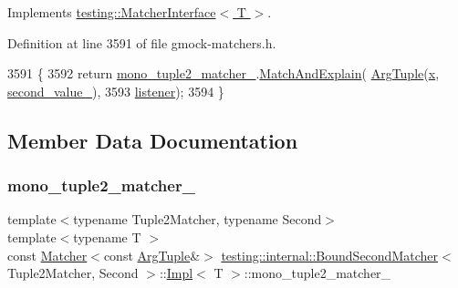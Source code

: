 Implements \hyperlink{classtesting_1_1MatcherInterface_a296b43607cd99d60365f0e6a762777cf}{testing\+::\+Matcher\+Interface$<$ T $>$}.



Definition at line 3591 of file gmock-\/matchers.\+h.


\begin{DoxyCode}
3591                                                                            \{
3592       \textcolor{keywordflow}{return} \hyperlink{classtesting_1_1internal_1_1BoundSecondMatcher_1_1Impl_a7b9610e5665d65f2837eb7e3121c7775}{mono\_tuple2\_matcher\_}.\hyperlink{classtesting_1_1internal_1_1MatcherBase_a08429a6d7e7d330de4a4eb4e272105a7}{MatchAndExplain}(
      \hyperlink{classtesting_1_1internal_1_1BoundSecondMatcher_1_1Impl_acf41615a5de6421fc89fd38118fc6384}{ArgTuple}(\hyperlink{namespaceinteractive__marker_acda52804aef30b460a72fb21ee01d69d}{x}, \hyperlink{classtesting_1_1internal_1_1BoundSecondMatcher_1_1Impl_a240ffac4b65c0fd361d8ff85dca35564}{second\_value\_}),
3593                                                   \hyperlink{namespaceinteractive__marker_a0e579ab555212bb5e2c9f8a675b7618a}{listener});
3594     \}
\end{DoxyCode}


\subsection{Member Data Documentation}
\mbox{\label{classtesting_1_1internal_1_1BoundSecondMatcher_1_1Impl_a7b9610e5665d65f2837eb7e3121c7775}} 
\subsubsection{\texorpdfstring{mono\+\_\+tuple2\+\_\+matcher\+\_\+}{mono\_tuple2\_matcher\_}}
{\footnotesize\ttfamily template$<$typename Tuple2\+Matcher, typename Second$>$ \\
template$<$typename T $>$ \\
const \hyperlink{classtesting_1_1Matcher}{Matcher}$<$const \hyperlink{classtesting_1_1internal_1_1BoundSecondMatcher_1_1Impl_acf41615a5de6421fc89fd38118fc6384}{Arg\+Tuple}\&$>$ \hyperlink{classtesting_1_1internal_1_1BoundSecondMatcher}{testing\+::internal\+::\+Bound\+Second\+Matcher}$<$ Tuple2\+Matcher, Second $>$\+::\hyperlink{classtesting_1_1internal_1_1BoundSecondMatcher_1_1Impl}{Impl}$<$ T $>$\+::mono\+\_\+tuple2\+\_\+matcher\+\_\+\hspace{0.3cm}{\ttfamily [private]}}



